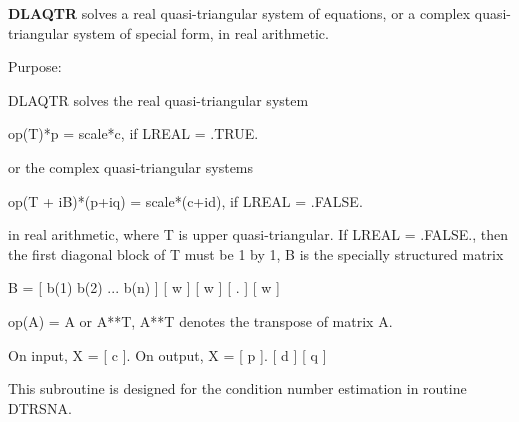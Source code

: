 {\bfseries D\+L\+A\+Q\+T\+R} solves a real quasi-\/triangular system of equations, or a complex quasi-\/triangular system of special form, in real arithmetic. 

 \begin{DoxyParagraph}{Purpose\+: }
\begin{DoxyVerb} DLAQTR solves the real quasi-triangular system

              op(T)*p = scale*c,               if LREAL = .TRUE.

 or the complex quasi-triangular systems

            op(T + iB)*(p+iq) = scale*(c+id),  if LREAL = .FALSE.

 in real arithmetic, where T is upper quasi-triangular.
 If LREAL = .FALSE., then the first diagonal block of T must be
 1 by 1, B is the specially structured matrix

                B = [ b(1) b(2) ... b(n) ]
                    [       w            ]
                    [           w        ]
                    [              .     ]
                    [                 w  ]

 op(A) = A or A**T, A**T denotes the transpose of
 matrix A.

 On input, X = [ c ].  On output, X = [ p ].
               [ d ]                  [ q ]

 This subroutine is designed for the condition number estimation
 in routine DTRSNA.\end{DoxyVerb}
 
\end{DoxyParagraph}

